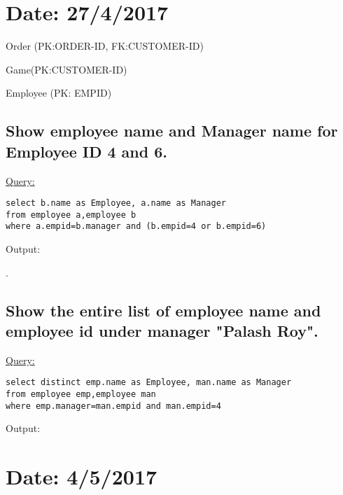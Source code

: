 \documentclass[a4paper,11pt]{article}
\begin{document}
\bigskip
\bigskip

\section{Date: 27/4/2017}
\bigskip

\LARGE{Order (PK:ORDER-ID, FK:CUSTOMER-ID)}

\bigskip

\large{}
\bigskip

\LARGE{Game(PK:CUSTOMER-ID)}

\bigskip
\bigskip

\large{}
\LARGE{Employee (PK: EMPID)}

\subsection{Show employee name and Manager name for Employee ID 4 and 6.}
\underline{Query:}
\begin{lstlisting}[showstringspaces=false]
select b.name as Employee, a.name as Manager 
from employee a,employee b
where a.empid=b.manager and (b.empid=4 or b.empid=6)
\end{lstlisting}
Output:
\begin{figure}[H]
\centering
{}
\end{figure}
.

\subsection{Show the entire list of employee name and employee id under manager "Palash Roy".}
\underline{Query:}
\begin{lstlisting}[showstringspaces=false]
select distinct emp.name as Employee, man.name as Manager 
from employee emp,employee man
where emp.manager=man.empid and man.empid=4
\end{lstlisting}
Output:
\begin{figure}[H]
\centering
{}
\end{figure}

\bigskip
\bigskip
\section{Date: 4/5/2017}
\large{}
\bigskip
\end{document}
